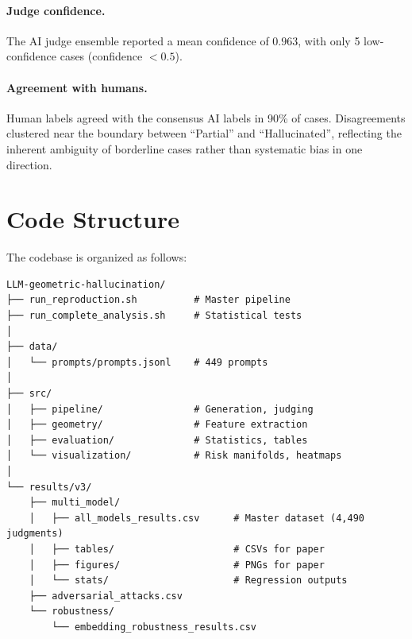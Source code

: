 \documentclass{article}
\begin{document}
\paragraph{Judge confidence.} The AI judge ensemble reported a mean confidence of $0.963$, with only 5 low-confidence cases (confidence $< 0.5$).

\paragraph{Agreement with humans.} Human labels agreed with the consensus AI labels in 90\% of cases. Disagreements clustered near the boundary between ``Partial'' and ``Hallucinated'', reflecting the inherent ambiguity of borderline cases rather than systematic bias in one direction.

\section{Code Structure}
\label{app:code-structure}

The codebase is organized as follows:

\begin{verbatim}
LLM-geometric-hallucination/
├── run_reproduction.sh          # Master pipeline
├── run_complete_analysis.sh     # Statistical tests
│
├── data/
│   └── prompts/prompts.jsonl    # 449 prompts
│
├── src/
│   ├── pipeline/                # Generation, judging
│   ├── geometry/                # Feature extraction
│   ├── evaluation/              # Statistics, tables
│   └── visualization/           # Risk manifolds, heatmaps
│
└── results/v3/
    ├── multi_model/
    │   ├── all_models_results.csv      # Master dataset (4,490 judgments)
    │   ├── tables/                     # CSVs for paper
    │   ├── figures/                    # PNGs for paper
    │   └── stats/                      # Regression outputs
    ├── adversarial_attacks.csv
    └── robustness/
        └── embedding_robustness_results.csv
\end{verbatim}
\end{document}

